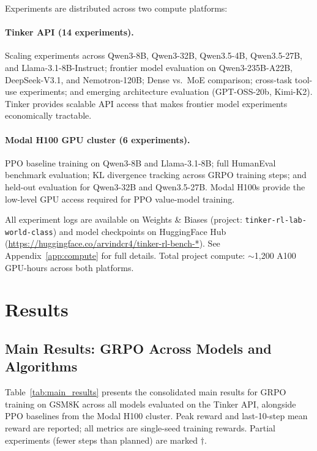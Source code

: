 \documentclass{article}
\begin{document}
Experiments are distributed across two compute platforms:

\paragraph{Tinker API (14 experiments).}
Scaling experiments across Qwen3-8B, Qwen3-32B, Qwen3.5-4B, Qwen3.5-27B,
and Llama-3.1-8B-Instruct; frontier model evaluation on Qwen3-235B-A22B,
DeepSeek-V3.1, and Nemotron-120B; Dense vs.~MoE comparison; cross-task
tool-use experiments; and emerging architecture evaluation (GPT-OSS-20b,
Kimi-K2). Tinker provides scalable API access that makes frontier model
experiments economically tractable.

\paragraph{Modal H100 GPU cluster (6 experiments).}
PPO baseline training on Qwen3-8B and Llama-3.1-8B; full HumanEval
benchmark evaluation; KL divergence tracking across GRPO training steps;
and held-out evaluation for Qwen3-32B and Qwen3.5-27B. Modal H100s
provide the low-level GPU access required for PPO value-model training.

All experiment logs are available on Weights \& Biases (project:
\texttt{tinker-rl-lab-world-class}) and model checkpoints on HuggingFace
Hub (\url{https://huggingface.co/arvindcr4/tinker-rl-bench-*}).
See Appendix~\ref{app:compute} for full details. Total project compute:
$\sim$1,200 A100 GPU-hours across both platforms.

\section{Results}
\label{sec:results}

\subsection{Main Results: GRPO Across Models and Algorithms}
\label{sec:main_results}

Table~\ref{tab:main_results} presents the consolidated main results for GRPO
training on GSM8K across all models evaluated on the Tinker API, alongside
PPO baselines from the Modal H100 cluster. Peak reward and last-10-step mean
reward are reported; all metrics are single-seed training rewards.
Partial experiments (fewer steps than planned) are marked $\dagger$.
\end{document}
